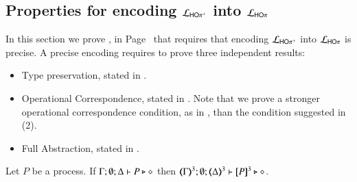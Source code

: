 

\subsection{Properties for encoding $\mathcal{L}_{\mathsf{HO\pi^{+}}}$ into $\mathcal{L}_{\mathsf{HO}\pi}$}
\label{app:HOpp_to_HOp}



In this section we prove , in Page~\pageref{f:enc:hoppptohop}
that requires that encoding
$\mathcal{L}_{\mathsf{HO\pi^{+}}}$ into $\mathcal{L}_{\mathsf{HO}\pi}$ is precise.
A precise encoding requires to prove three independent results:
\begin{itemize}
	\item	Type preservation, stated in .
	\item	Operational Correspondence, stated in .
		Note that we prove a stronger operational correspondence condition,
		as in ,
		than the condition suggested in (2).
	\item	Full Abstraction, stated in .
\end{itemize}

\begin{proposition}\myrm
	\label{app:prop:typepres_HOpp_to_HOp}
	Let $P$ be a \HOpp process.
	If $\Gamma; \emptyset; \Delta \vdash P \triangleright \diamond$ then 
	$\tmap{\Gamma}{3}; \emptyset; \tmap{\Delta}{3} \proves \pmap{P}{3} \hastype \Proc$. 
\end{proposition}

